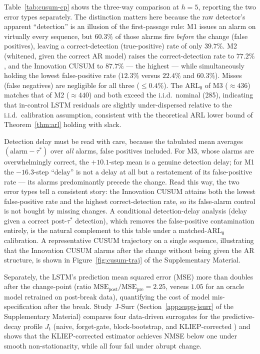 \documentclass[bj,authoryear]{imsart}
\theoremstyle{plain}
\theoremstyle{definition}
\begin{document}
Table~\ref{tab:cusum-cp} shows the three-way comparison at $h = 5$,
reporting the two error types separately.
The distinction matters here because the raw detector's apparent
``detection'' is an illusion of the first-passage rule: M1 issues an
alarm on virtually every sequence, but $60.3\%$ of those alarms fire
\emph{before} the change (false positives), leaving a correct-detection
(true-positive) rate of only $39.7\%$.  M2 (whitened, given the correct
AR model) raises the correct-detection rate to $77.2\%$, and the
Innovation CUSUM to $87.7\%$ --- the highest --- while simultaneously
holding the lowest false-positive rate ($12.3\%$ versus $22.4\%$ and
$60.3\%$).  Misses (false negatives) are negligible for all three
($\leq 0.4\%$).
The $\mathrm{ARL}_0$ of M3 ($\approx 436$) matches that of M2
($\approx 440$) and both exceed the i.i.d.\ nominal (285), indicating that in-control LSTM 
residuals are slightly under-dispersed relative to the i.i.d.\ calibration assumption, consistent 
with the theoretical ARL lower bound of Theorem~\ref{thm:arl} holding with slack.

Detection delay must be read with care, because the tabulated mean averages
$(\text{alarm}-\tau^*)$ over \emph{all} alarms, false positives included.
For M3, whose alarms are overwhelmingly correct, the $+10.1$-step mean is a
genuine detection delay; for M1 the $-16.3$-step ``delay'' is not a delay
at all but a restatement of its false-positive rate --- its alarms
predominantly precede the change.  Read this way, the two error types tell
a consistent story: the Innovation CUSUM attains both the lowest
false-positive rate and the highest correct-detection rate, so its
false-alarm control is not bought by missing changes.  A conditional
detection-delay analysis (delay given a correct post-$\tau^*$ detection),
which removes the false-positive contamination entirely, is the natural
complement to this table under a matched-$\mathrm{ARL}_0$ calibration.
A representative CUSUM trajectory on a single sequence, illustrating that the
Innovation CUSUM alarms after the change without being given the AR structure,
is shown in Figure~\ref{fig:cusum-traj} of the Supplementary Material.

Separately, the LSTM's prediction mean squared error (MSE) more than doubles
after the change-point (ratio $\mathrm{MSE}_{\mathrm{post}}/\mathrm{MSE}_{\mathrm{pre}}
= 2.25$, versus $1.05$ for an oracle model retrained on post-break data),
quantifying the cost of model mis-specification after the break.
Study~J-Surr (Section~\ref{app:supp-jsurr} of the Supplementary Material) compares four data-driven surrogates
for the predictive-decay profile $J_t$ (naive, forget-gate, block-bootstrap,
and KLIEP-corrected \citealt{sugiyama2012density}) and shows that the
KLIEP-corrected estimator achieves NMSE below one under smooth
non-stationarity, while all four fail under abrupt change.
\end{document}
